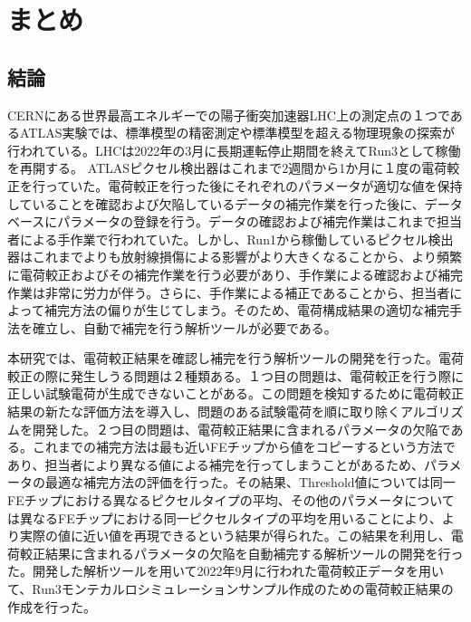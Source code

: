 \chapter{まとめ}
\label{sec:chap8}

\section{結論}
\label{sec:ketsuron}

CERNにある世界最高エネルギーでの陽子衝突加速器LHC上の測定点の１つであるATLAS実験では、標準模型の精密測定や標準模型を超える物理現象の探索が行われている。LHCは2022年の3月に長期運転停止期間を終えてRun3として稼働を再開する。
ATLASピクセル検出器はこれまで2週間から1か月に１度の電荷較正を行っていた。電荷較正を行った後にそれぞれのパラメータが適切な値を保持していることを確認および欠陥しているデータの補完作業を行った後に、データベースにパラメータの登録を行う。データの確認および補完作業はこれまで担当者による手作業で行われていた。しかし、Run1から稼働しているピクセル検出器はこれまでよりも放射線損傷による影響がより大きくなることから、より頻繁に電荷較正およびその補完作業を行う必要があり、手作業による確認および補完作業は非常に労力が伴う。さらに、手作業による補正であることから、担当者によって補完方法の偏りが生じてしまう。そのため、電荷構成結果の適切な補完手法を確立し、自動で補完を行う解析ツールが必要である。

本研究では、電荷較正結果を確認し補完を行う解析ツールの開発を行った。電荷較正の際に発生しうる問題は２種類ある。１つ目の問題は、電荷較正を行う際に正しい試験電荷が生成できないことがある。この問題を検知するために電荷較正結果の新たな評価方法を導入し、問題のある試験電荷を順に取り除くアルゴリズムを開発した。２つ目の問題は、電荷較正結果に含まれるパラメータの欠陥である。これまでの補完方法は最も近いFEチップから値をコピーするという方法であり、担当者により異なる値による補完を行ってしまうことがあるため、パラメータの最適な補完方法の評価を行った。その結果、Threshold値については同一FEチップにおける異なるピクセルタイプの平均、その他のパラメータについては異なるFEチップにおける同一ピクセルタイプの平均を用いることにより、より実際の値に近い値を再現できるという結果が得られた。この結果を利用し、電荷較正結果に含まれるパラメータの欠陥を自動補完する解析ツールの開発を行った。開発した解析ツールを用いて2022年9月に行われた電荷較正データを用いて、Run3モンテカルロシミュレーションサンプル作成のための電荷較正結果の作成を行った。

